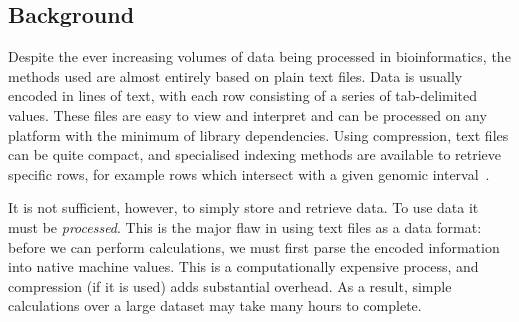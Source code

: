 \documentclass[10pt]{bmc_article}
\newenvironment{bmcformat}{\begin{raggedright}\baselineskip20pt\sloppy\setboolean{publ}{false}}{\end{raggedright}\baselineskip20pt\sloppy}
\begin{document}
\begin{bmcformat}


\section*{Background} 

%
Despite the ever increasing volumes of data being processed in bioinformatics,
the methods used are almost entirely based on plain text files. Data is 
usually encoded in lines of text, with each row consisting of a series of tab-delimited 
values.
These files are easy to view and interpret and can be processed on 
any platform with the minimum of library dependencies. Using compression,
text files can be quite compact, and specialised indexing methods 
are available to retrieve specific rows, for example rows which intersect with a 
given genomic interval~\cite{li11}.

It is not sufficient, however, to simply store and retrieve data. To use data
it must be \emph{processed}. This is the major flaw in 
using text files as a data format: before we can perform calculations, we 
must first parse the encoded information into native 
machine values. This is a computationally expensive process, and 
compression (if it is used) adds substantial overhead. 
As a result,  simple calculations over a large dataset may take 
many hours to complete.


\end{bmcformat}
\end{document}
